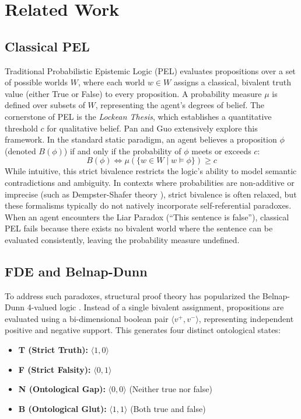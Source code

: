 \documentclass[11pt,a4paper]{article}
\begin{document}
\section{Related Work}
\label{sec:relatedwork}

\subsection{Classical PEL}
Traditional Probabilistic Epistemic Logic (PEL) evaluates propositions over a set of possible worlds $W$, where each world $w \in W$ assigns a classical, bivalent truth value (either True or False) to every proposition. A probability measure $\mu$ is defined over subsets of $W$, representing the agent's degrees of belief. The cornerstone of PEL is the \textit{Lockean Thesis}, which establishes a quantitative threshold $c$ for qualitative belief. Pan and Guo \cite{pan2024probabilistic} extensively explore this framework. In the standard static paradigm, an agent believes a proposition $\phi$ (denoted $B(\phi)$) if and only if the probability of $\phi$ meets or exceeds $c$:
\begin{equation}
    B(\phi) \iff \mu(\{w \in W \mid w \models \phi\}) \ge c
\end{equation}
While intuitive, this strict bivalence restricts the logic's ability to model semantic contradictions and ambiguity. In contexts where probabilities are non-additive or imprecise (such as Dempster-Shafer theory \cite{shafer1976}), strict bivalence is often relaxed, but these formalisms typically do not natively incorporate self-referential paradoxes. When an agent encounters the Liar Paradox (``This sentence is false''), classical PEL fails because there exists no bivalent world where the sentence can be evaluated consistently, leaving the probability measure undefined.

\subsection{FDE and Belnap-Dunn}
To address such paradoxes, structural proof theory has popularized the Belnap-Dunn 4-valued logic \cite{belnap1977}. Instead of a single bivalent assignment, propositions are evaluated using a bi-dimensional boolean pair $\langle v^+, v^- \rangle$, representing independent positive and negative support. This generates four distinct ontological states:
\begin{itemize}
    \item \textbf{T (Strict Truth):} $\langle 1, 0 \rangle$
    \item \textbf{F (Strict Falsity):} $\langle 0, 1 \rangle$
    \item \textbf{N (Ontological Gap):} $\langle 0, 0 \rangle$ (Neither true nor false)
    \item \textbf{B (Ontological Glut):} $\langle 1, 1 \rangle$ (Both true and false)
\end{itemize}
\end{document}
